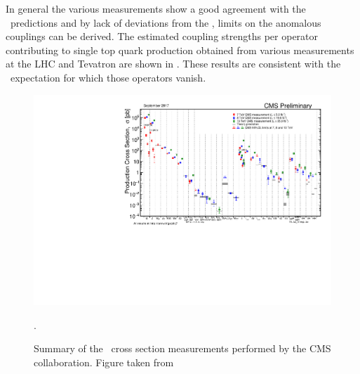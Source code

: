 In general the various measurements show a good agreement with the \SM\ predictions and by lack of deviations from the \SM, limits on the anomalous couplings can be derived. The estimated coupling strengths per operator contributing to single top quark production obtained from various measurements at the LHC and Tevatron are shown in . These results are consistent with the \SM\ expectation for which those operators vanish.   

\begin{figure}[htbp]
	\centering
	\includegraphics[width=1.\linewidth]{1_Introduction/Figures/SigmaNew_v0}
	\caption{Summary of the \SM\ cross section measurements performed by the CMS collaboration. Figure taken from \cite{summarywiki}}.
	\label{fig:sigmanewv0}
\end{figure}

